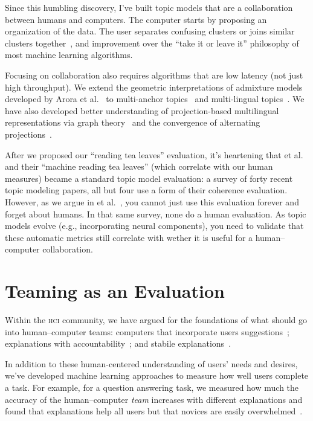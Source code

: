 \documentclass[11pt]{amsart}
\newcommand{\abr}[1]{\textsc{#1}}
\newcommand{\newcite}[2]{\capitalisewords{#1} et al.~\cite{#1-#2}}
\begin{document}
Since this humbling discovery, I've built topic models that are a
collaboration between humans and computers.  The computer starts by
proposing an organization of the data.  The user separates confusing
clusters or joins similar clusters together~\cite{hu-14:itm}, and
improvement over the ``take it or leave it'' philosophy of most
machine learning algorithms.

Focusing on collaboration also requires algorithms that are low
latency (not just high throughput). We extend the
geometric interpretations of admixture models developed by Arora et
al.~\cite{arora-12} to multi-anchor topics~\cite{lund-17} and
multi-lingual topics~\cite{Yuan-18}. We have also developed better
understanding of projection-based multilingual representations via
graph theory~\cite{Fujinuma-19} and the convergence of alternating
projections~\cite{Zhang-19}.

After we proposed our ``reading tea leaves'' evaluation, it's
heartening that \newcite{lau}{14} and their ``machine reading tea
leaves'' (which correlate with our human measures) became a standard
topic model evaluation: a survey of forty recent topic modeling
papers, all but four use a form of their coherence evaluation.
%
However, as we argue in \newcite{hoyle}{21}, you cannot just use this
evaluation forever and forget about humans.
%
In that same survey, none do a human evaluation.
%
As topic models evolve (e.g., incorporating
neural components), you need to validate that these automatic metrics
still correlate with wether it is useful for a human--computer
collaboration.

\section{Teaming as an Evaluation}

Within the \abr{hci} community, we have argued for the foundations of
what should go into human--computer teams: computers that incorporate
users suggestions~\cite{kumar-19}; explanations with
accountability~\cite{smith-20}; and stabile
explanations~\cite{smith-20:adherence}.

In addition to these human-centered understanding of users' needs and
desires, we've developed machine learning approaches to measure how
well users complete a task.
%
For example, for a question answering task, we measured how much the
accuracy of the human--computer \emph{team} increases with different
explanations and found that explanations help all users but that
novices are easily overwhelmed~\cite{feng-19}.
\end{document}
